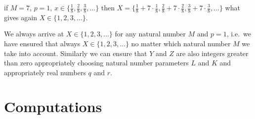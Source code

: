\documentclass[SecEq,CM,GP]{degruyter-crelle} %
\theoremstyle{plain}
\theoremstyle{definition}
\begin{document}
if $M=7$, $p=1$, $x \in \{ \frac{1}{8}, \frac{2}{8}, \frac{3}{8}, \ldots \}$
 then $X = \{\frac{1}{8} + 7 \cdot \frac{1}{8}, \frac{2}{8} + 7 \cdot \frac{2}{8}, \frac{3}{8} + 7 \cdot \frac{3}{8}, \ldots \}$
what gives again
$X \in \{1, 2, 3, \ldots \}$\@.

We always arrive at $X \in \{1, 2, 3, \ldots \}$ for any natural number $M$ and $p=1$,
i.e.~we have ensured that always $X \in \{1, 2, 3, \ldots \}$ no matter which natural number $M$ we take
into account. Similarly we can ensure that $Y$ and $Z$ are also integers greater than zero
appropriately choosing natural number parameters $L$ and $K$ and appropriately real numbers $q$ and $r$\@.


\section{Computations}\label{sec:computations}
\end{document}
